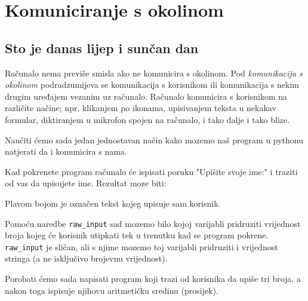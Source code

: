 \chapter{Komuniciranje s okolinom}

\section{Sto je danas lijep i sunčan dan}

	Računalo nema previše smisla ako ne komunicira s okolinom. Pod
	\emph{komunikacija s okolinom} podradzumijeva se komunikacija s korisnikom ili
	komunikacija s nekim drugim uređajem vezanim uz računalo. Računalo
	komunicira s korisnikom na različite načine; npr. klikanjem po ikonama,
	upisivanjem teksta u nekakav formular, diktiranjem u mikrofon spojen 
	na računalo, i tako dalje i tako blize.

	Naučiti ćemo sada jedan jednostavan način kako mozemo naš program u
	pythonu natjerati da i komunicira s nama.


	Kad pokrenete program računalo će ispisati poruku "Upišite svoje ime:" i
	traziti od vas da upisujete ime. Rezultat moze biti:


	Plavom bojom je označen tekst kojeg upisuje sam korisnik.

	Pomoću naredbe \verb+raw_input+ sad mozemo bilo kojoj varijabli 
	pridruziti vrijednost broja kojeg će korisnik utipkati tek u trenutku kad 
	se program pokrene. \verb"raw_input" je sličan, ali s njime mozemo toj
	varijabli pridruziti i vrijednost stringa (a ne isključivo brojevnu
	vrijednost).

	Porobati ćemo sada napisati program koji trazi od korisnika da upiše 
	tri broja, a nakon toga ispisuje njihovu aritmetičku sredinu (prosijek).


